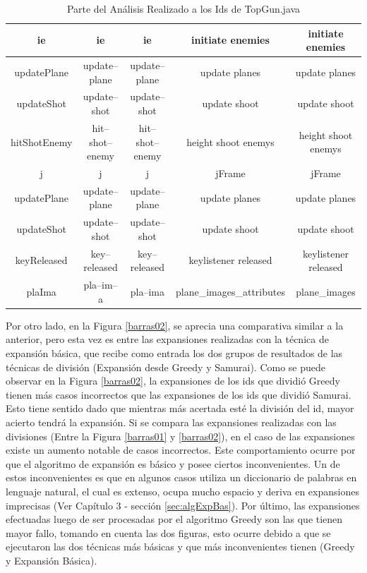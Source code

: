\begin{table}
\begin{tabular}{| c | c | c | c | c |}
ie&ie&ie&initiate enemies&initiate enemies\\ \hline
updatePlane&update--plane&update--plane&update planes&update planes\\ \hline
updateShot&update--shot&update--shot&update shoot&update shoot\\ \hline
hitShotEnemy&hit--shot--enemy&hit--shot--enemy&height shoot enemys&height shoot enemys\\ \hline
j&j&j&jFrame&jFrame\\ \hline
updatePlane&update--plane&update--plane&update planes&update planes\\ \hline
updateShot&update--shot&update--shot&update shoot&update shoot\\ \hline
keyReleased&key--released&key--released&keylistener released&keylistener released\\ \hline
plaIma&pla--im--a&pla--ima&plane\_images\_attributes&plane\_images \\ \hline
   
   	\end{tabular}  
	 
   \caption{Parte del Análisis Realizado a los Ids de TopGun.java}
   \label{tabla7}
     
\end{table} 

\clearpage %



Por otro lado, en la Figura \ref{barras02}, se aprecia una comparativa similar a la anterior, pero esta vez es entre las expansiones realizadas con la técnica de expansión básica, que recibe como entrada los dos grupos de resultados de las técnicas de división (Expansión desde Greedy y Samurai). Como se puede observar en la Figura \ref{barras02}, la expansiones de los ids que dividió Greedy tienen más casos incorrectos que las expansiones de los ids que dividió Samurai. Esto tiene sentido dado que mientras más acertada esté la división del id, mayor acierto tendrá la expansión. Si se compara las expansiones realizadas con las divisiones (Entre la Figura \ref{barras01} y \ref{barras02}), en el caso de las expansiones existe un aumento notable de casos incorrectos. 
Este comportamiento ocurre por que el algoritmo de expansión es básico y posee ciertos inconvenientes. Un de estos inconvenientes es que en algunos casos utiliza un diccionario de palabras en lenguaje natural, el cual es extenso, ocupa mucho espacio y deriva en expansiones imprecisas (Ver Capítulo 3 - sección \ref{sec:algExpBas}).
Por último, las expansiones efectuadas luego de ser procesadas por el algoritmo Greedy son las que tienen mayor fallo, tomando en cuenta las dos figuras, esto ocurre debido a que se ejecutaron las dos técnicas más básicas y que más inconvenientes tienen (Greedy y Expansión Básica).

